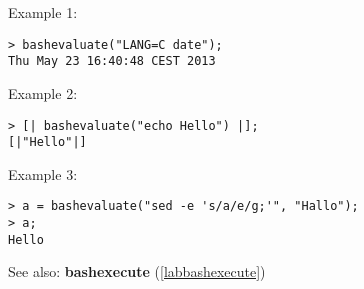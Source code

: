 \noindent Example 1: 
\begin{center}\begin{minipage}{15cm}\begin{Verbatim}[frame=single]
> bashevaluate("LANG=C date");
Thu May 23 16:40:48 CEST 2013
\end{Verbatim}
\end{minipage}\end{center}
\noindent Example 2: 
\begin{center}\begin{minipage}{15cm}\begin{Verbatim}[frame=single]
> [| bashevaluate("echo Hello") |];
[|"Hello"|]
\end{Verbatim}
\end{minipage}\end{center}
\noindent Example 3: 
\begin{center}\begin{minipage}{15cm}\begin{Verbatim}[frame=single]
> a = bashevaluate("sed -e 's/a/e/g;'", "Hallo");
> a;
Hello
\end{Verbatim}
\end{minipage}\end{center}
See also: \textbf{bashexecute} (\ref{labbashexecute})
